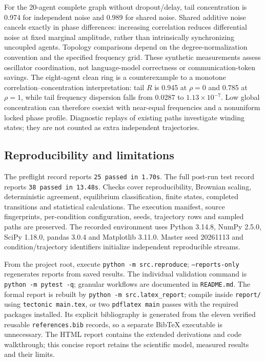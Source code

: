 \documentclass[11pt,a4paper]{article}
\begin{document}
For the 20-agent complete graph without dropout/delay, tail concentration is 0.974 for independent noise and 0.989 for shared noise. Shared additive noise cancels exactly in phase differences: increasing correlation reduces differential noise at fixed marginal amplitude, rather than intrinsically synchronizing uncoupled agents. Topology comparisons depend on the degree-normalization convention and the specified frequency grid. These synthetic measurements assess oscillator coordination, not language-model correctness or communication-token savings.
The eight-agent clean ring is a counterexample to a monotone correlation--concentration interpretation: tail $R$ is 0.945 at $\rho=0$ and 0.785 at $\rho=1$, while tail frequency dispersion falls from 0.0287 to $1.13\!\times\!10^{-7}$. Low global concentration can therefore coexist with near-equal frequencies and a nonuniform locked phase profile. Diagnostic replays of existing paths investigate winding states; they are not counted as extra independent trajectories.
\subsection{Reproducibility and limitations}
The preflight record reports \texttt{25 passed in 1.70s}. The full post-run test record reports \texttt{38 passed in 13.48s}. Checks cover reproducibility, Brownian scaling, deterministic agreement, equilibrium classification, finite states, completed transitions and statistical calculations. The execution manifest, source fingerprints, per-condition configuration, seeds, trajectory rows and sampled paths are preserved. The recorded environment uses Python 3.14.8, NumPy 2.5.0, SciPy 1.18.0, pandas 3.0.4 and Matplotlib 3.11.0. Master seed 20261113 and condition/trajectory identifiers initialize independent reproducible streams.

From the project root, execute \texttt{python -m src.reproduce}; \texttt{--reports-only} regenerates reports from saved results. The individual validation command is \texttt{python -m pytest -q}; granular workflows are documented in \texttt{README.md}. The formal report is rebuilt by \texttt{python -m src.latex\_report}; compile inside \texttt{report/} using \texttt{tectonic main.tex}, or two \texttt{pdflatex main} passes with the required packages installed. Its explicit bibliography is generated from the eleven verified reusable \texttt{references.bib} records, so a separate BibTeX executable is unnecessary. The HTML report contains the extended derivations and code walkthrough; this concise report retains the scientific model, measured results and their limits.
\end{document}
